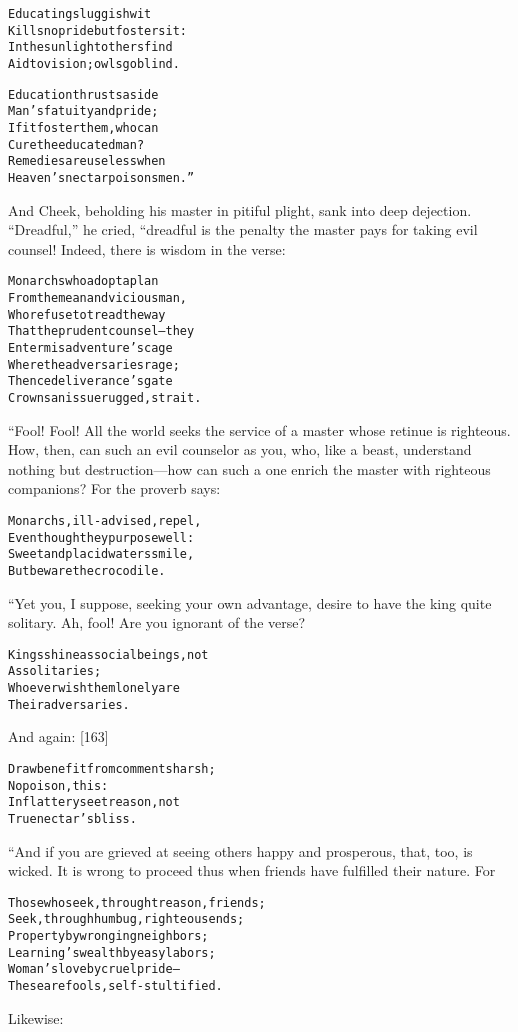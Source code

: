 \documentclass{article}
\renewenvironment{verbatim}{\begin{alltt}\normalfont\begin{centering}}{\end{centering}\end{alltt}}
\begin{document}
\begin{verbatim}
Educating sluggish wit
Kills no pride but fosters it:
In the sunlight others find
Aid to vision; owls go blind.

Education thrusts aside
Man's fatuity and pride;
If it foster them, who can
Cure the educated man?
Remedies are useless when
Heaven's nectar poisons men.”
\end{verbatim}
And Cheek, beholding his master in pitiful plight, sank into deep
dejection. ``Dreadful,'' he cried, “dreadful is the penalty the
master pays for taking evil counsel! Indeed, there is wisdom in the
verse:

\begin{verbatim}
Monarchs who adopt a plan
From the mean and vicious man,
Who refuse to tread the way
That the prudent counsel--they
Enter misadventure's cage
Where the adversaries rage;
Thence deliverance's gate
Crowns an issue rugged, strait.
\end{verbatim}
“Fool! Fool! All the world seeks the service of a master whose
retinue is righteous. How, then, can such an evil counselor as you,
who, like a beast, understand nothing but destruction---how can
such a one enrich the master with righteous companions? For the
proverb says:

\begin{verbatim}
Monarchs, ill-advised, repel,
Even though they purpose well:
Sweet and placid waters smile,
But beware the crocodile.
\end{verbatim}
“Yet you, I suppose, seeking your own advantage, desire to have the
king quite solitary. Ah, fool! Are you ignorant of the verse?

\begin{verbatim}
Kings shine as social beings, not
    As solitaries;
Whoever wish them lonely are
    Their adversaries.
\end{verbatim}
And again: [163]

\begin{verbatim}
Draw benefit from comments harsh;
    No poison, this:
In flattery see treason, not
    True nectar's bliss.
\end{verbatim}
“And if you are grieved at seeing others happy and prosperous,
that, too, is wicked. It is wrong to proceed thus when friends have
fulfilled their nature. For

\begin{verbatim}
Those who seek, through treason, friends;
Seek, through humbug, righteous ends;
Property by wronging neighbors;
Learning's wealth by easy labors;
Woman's love by cruel pride--
These are fools, self-stultified.
\end{verbatim}
Likewise:
\end{document}
